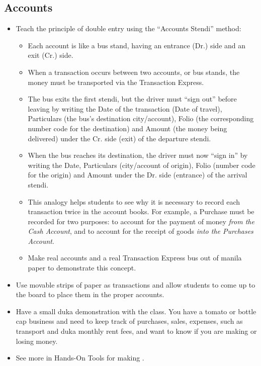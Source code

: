 	\subsection{Accounts} \label{accountsactivities}
	\begin{itemize}
	\item Teach the principle of double entry using the ``Accounts Stendi'' method:
		\begin{itemize}
		\item Each account is like a bus stand, having an entrance (Dr.) side and an exit (Cr.) side. 
		\item When a transaction occurs between two accounts, or bus stands, the money must be transported via the Transaction Express.
		\item The bus exits the first stendi, but the driver must ``sign out'' before leaving by writing the Date of the transaction (Date of travel), Particulars (the bus's destination city\slash account), Folio (the corresponding number code for the destination) and Amount (the money being delivered) under the Cr. side (exit) of the departure stendi.
		\item When the bus reaches its destination, the driver must now ``sign in'' by writing the Date, Particulars (city\slash account of origin), Folio (number code for the origin) and Amount under the Dr. side (entrance) of the arrival stendi.
		\item This analogy helps students to see why it is necessary to record each transaction twice in the account books. For example, a Purchase must be recorded for two purposes: to account for the payment of money \emph{from the Cash Account}, and to account for the receipt of goods \emph{into the Purchases Account}.
		\item Make real accounts and a real Transaction Express bus out of manila paper to demonstrate this concept.
		\end{itemize}
	\item Use movable strips of paper as transactions and allow students to come up to the board to place them in the proper accounts.
	\item Have a small duka demonstration with the class. You have a tomato or bottle cap business and need to keep track of purchases, sales, expenses, such as transport and duka monthly rent fees, and want to know if you are making or losing money.
	\item See more in Hands-On Tools for making .
	\end{itemize}

